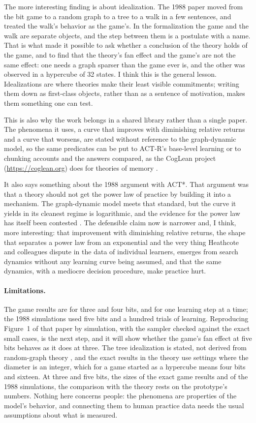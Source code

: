 \documentclass[11pt]{article}
\begin{document}
The more interesting finding is about idealization. The 1988 paper moved
from the bit game to a random graph to a tree to a walk in a few sentences,
and treated the walk's behavior as the game's. In the formalization the
game and the walk are separate objects, and the step between them is a
postulate with a name. That is what made it possible to ask whether a
conclusion of the theory holds of the game, and to find that the theory's
fan effect and the game's are not the same effect: one needs a graph
sparser than the game ever is, and the other was observed in a hypercube
of 32 states.
I think this is the general lesson. Idealizations are where theories make
their least visible commitments; writing them down as first-class objects,
rather than as a sentence of motivation, makes them something one can test.

This is also why the work belongs in a shared library rather than a single paper. The
phenomena it uses, a curve that improves with diminishing relative returns and a curve
that worsens, are stated without reference to the graph-dynamic model, so the same
predicates can be put to ACT-R's base-level learning or to chunking accounts and the
answers compared, as the CogLean project (\url{https://coglean.org}) does for theories
of memory \citep{cogleanintro}.

It also says something about the 1988 argument with ACT*. That argument was
that a theory should not get the power law of practice by building it into a
mechanism. The graph-dynamic model meets that standard, but the curve it
yields in its cleanest regime is logarithmic, and the evidence for the power
law has itself been contested \citep{heathcote2000}. The defensible claim
now is narrower and, I think, more interesting: that improvement with
diminishing relative returns, the shape that separates a power law from
an exponential and the very thing Heathcote and colleagues dispute in the
data of individual learners,
emerges from search dynamics without any learning curve being assumed, and
that the same dynamics, with a mediocre decision procedure, make practice
hurt.

\paragraph{Limitations.} The game results are for three and four bits, and
for one learning step at a time; the 1988 simulations used five bits and a
hundred trials of learning. Reproducing Figure~1 of that paper by
simulation, with the sampler checked against the exact small cases, is the
next step, and it will show whether the game's fan effect at five bits
behaves as it does at three. The tree idealization is stated, not derived
from random-graph theory \citep{bollobas1985}, and the exact results in the
theory use settings where the diameter is an integer, which for a game
started as a hypercube means four bits and sixteen. At three and five
bits, the sizes of the exact game results and of the 1988 simulations, the
comparison with the theory rests on the prototype's numbers. Nothing here concerns
people: the phenomena are properties of the model's behavior, and
connecting them to human practice data needs the usual assumptions about
what is measured.
\end{document}
